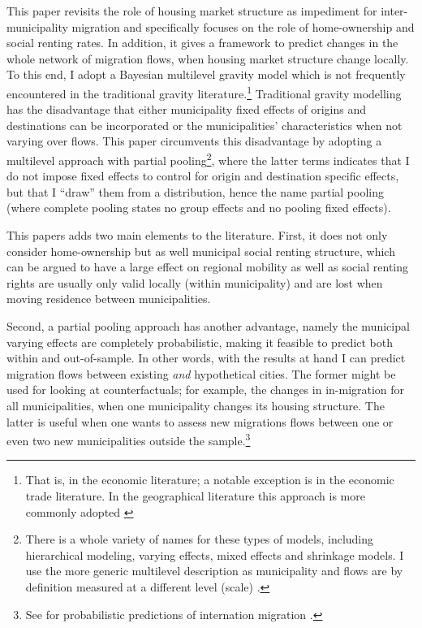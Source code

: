 \documentclass[fleqn,10pt]{SelfArx} %
\begin{document}
        This paper revisits the role of housing market structure
        as impediment for inter-municipality migration and specifically
        focuses on the role of home-ownership and social renting
        rates. In addition, it gives a framework to predict changes 
        in the whole network of migration flows, when housing market structure change locally. 
        To this end, I adopt a Bayesian multilevel gravity model
        which is not frequently encountered in the traditional gravity 
        literature.\footnote{That is, in the economic literature; a
          notable exception is \citet{ranjan2007bayesian} in the
          economic trade literature. In the geographical literature
          this approach is more commonly adopted \citep[see within a
          migration context][]{congdon2010random,
            congdon2012spatial}} Traditional gravity modelling has
        the disadvantage that either municipality fixed effects of origins
        and destinations can be incorporated or the municipalities'
        characteristics when not varying over flows. This paper
        circumvents this disadvantage by adopting a multilevel
        approach with partial pooling\footnote{There is a whole
          variety of names for these types of models, including
          hierarchical modeling, varying effects, mixed effects and
          shrinkage models. I use the more generic multilevel
          description as municipality and flows are by definition measured
          at a different level (scale) \citep[see][for an indepth discussion]{gelman2013bayesian}.}, where the latter terms
        indicates that I do not impose fixed effects to control for
        origin and destination specific effects, but that I ``draw''
        them from a distribution, hence the name partial pooling
        (where complete pooling states no group effects and no pooling
        fixed effects).
               
        This papers adds two main elements to the literature. First, it does not
        only consider home-ownership but as well municipal social renting
        structure, which can be argued \citep[see, e.g.,][]{hughes1981council, boyle1997public,boyle1998migration}
         to have a large effect on regional mobility as well
        as social renting rights are usually only valid locally (within
        municipality) and are lost when moving residence between municipalities.
        
        Second, a partial pooling approach has another advantage, namely the
        municipal varying effects are completely probabilistic, making it
        feasible to predict both within and out-of-sample. In other words, with
        the results at hand I can predict migration flows between existing
        \emph{and} hypothetical cities. The former might be used for looking at
        counterfactuals; for example, the changes in in-migration for all
        municipalities, when one municipality changes its housing structure. The
        latter is useful when one wants to assess new migrations flows between
        one or even two new municipalities outside the sample.\footnote{See for
          probabilistic predictions of internation migration
          \cite{azose2015bayesian}.}
	
\end{document}
